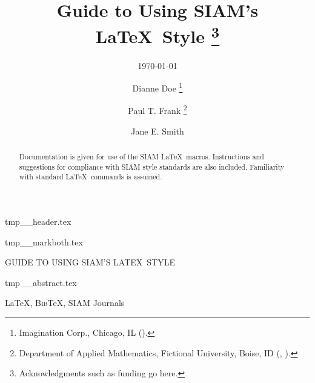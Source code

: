\documentclass[]{siamart}
\newcommand{\BibTeX}{{\scshape Bib}\TeX\xspace}
\begin{document}
\begin{tcbverbatimwrite}{tmp_\jobname_header.tex}
\title{Guide to Using SIAM's \LaTeX\ Style%
  \thanks{Acknowledgments such as funding go here.}}

\subtitle{\today} 

\author{Dianne Doe%
  \thanks{Imagination Corp., Chicago, IL ().}%
  \and
  Paul T. Frank%
  \thanks{Department of Applied Mathematics, Fictional University, Boise, ID
    (, ).}
  \and
  Jane E. Smith%
  \footnotemark[3]
}

\maketitle

\end{tcbverbatimwrite}


\begin{tcbverbatimwrite}{tmp_\jobname_markboth.tex}
\pagestyle{myheadings}
\thispagestyle{plain}
%
{\MakeUppercase{\siampretitle\@ Guide to Using  SIAM'S \LaTeX\ Style}}
\end{tcbverbatimwrite}




\begin{tcbverbatimwrite}{tmp_\jobname_abstract.tex}
\begin{abstract}
  Documentation is given for use of the SIAM \LaTeX\ macros.
  Instructions and suggestions for compliance with SIAM style
  standards are also included. Familiarity with standard \LaTeX\
  commands is assumed.
\end{abstract}

\begin{keywords}
  \LaTeX, \BibTeX, SIAM Journals 
\end{keywords}

\begin{AMS}
\end{AMS}
\end{tcbverbatimwrite}

\end{document}
